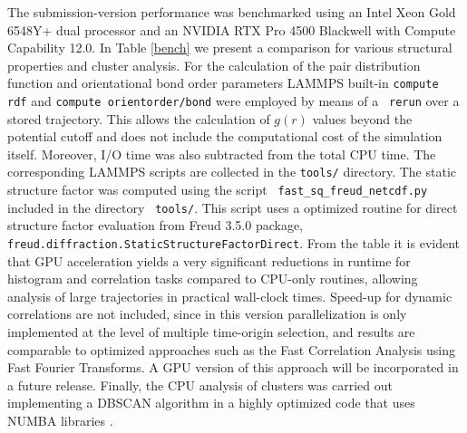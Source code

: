 \documentclass[final,1p,times]{elsarticle}
\begin{document}
The submission-version performance was benchmarked using an Intel Xeon Gold 6548Y+ dual
processor and an NVIDIA RTX Pro 4500 Blackwell with Compute Capability
12.0. In Table \ref{bench} we present a comparison for various
structural properties and cluster analysis. For the calculation of the
pair distribution function and orientational bond order
parameters\cite{Steinhard1983} LAMMPS built-in {\tt compute rdf} and
{\tt compute orientorder/bond} were employed by means of  a {\tt
  rerun} over a stored trajectory. This allows
the calculation of $g(r)$ values beyond the potential cutoff and does
not include the computational cost of the simulation itself. Moreover,
I/O time was also subtracted from the total CPU time. The
corresponding LAMMPS scripts are collected in the {\tt tools/}
directory. The
static structure factor was computed using the script {\tt
  fast\_sq\_freud\_netcdf.py} included in the directory {\tt
  tools/}. This script uses a optimized routine for direct structure
factor evaluation from Freud 3.5.0 package\cite{freud2020}, \nolinkurl{freud.diffraction.StaticStructureFactorDirect}. From the
table it is evident that GPU acceleration yields a very significant
reductions in runtime for histogram and correlation tasks compared to
CPU-only routines, allowing analysis of large trajectories in
practical wall-clock times. Speed-up for dynamic correlations are not
included, since in this version parallelization is only implemented at
the level of multiple time-origin selection, and results are
comparable to optimized approaches such as the Fast Correlation
Analysis using Fast Fourier Transforms\cite{Kneller1995FCA}. A GPU
version of this approach will be incorporated in a future release.
Finally, the CPU analysis of clusters was carried out implementing a
DBSCAN algorithm in a highly optimized code that uses NUMBA libraries
\cite{Lamaetal2015,LombaMoreno2026}. 
\end{document}
